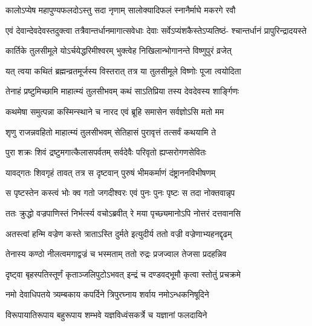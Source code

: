 \twolineshloka
{कालोऽप्येष महापुण्यफलदोऽस्तु सदा नृणाम्}
{सालोक्यादिफलं स्नानैर्माघे मकरगे रवौ} %

\fourlineindentedshloka
{एवं देवान्देवदेवस्तदुक्त्वा}
{तत्रैवान्तर्धानमागात्सवेधाः}
{देवाः सर्वेऽप्यंशकैस्तेऽप्यतिष्ठं-}
{श्चान्तर्धानं प्रापुरिन्द्रादयस्ते} %

\twolineshloka
{कार्तिके तुलसीमूले योऽर्चयेद्धरिमीश्वरम्}
{भुक्त्वेह निखिलान्भोगानन्ते विष्णुपुरं व्रजेत्} %





\twolineshloka
{यत् त्वया कथितं ब्रह्मन्व्रतमूर्जस्य विस्तरात्}
{तत्र या तुलसीमूले विष्णोः पूजा त्वयोदिता} %

\twolineshloka
{तेनाहं प्रष्टुमिच्छामि माहात्म्यं तुलसीभवम्}
{कथं साऽतिप्रिया तस्य देवदेवस्य शार्ङ्गिणः} %

\twolineshloka
{कथमेषा समुत्पन्ना कस्मिन्स्थाने च नारद}
{एवं ब्रूहि समासेन सर्वज्ञोऽसि मतो मम} %


\twolineshloka
{शृणु राजन्नवहितो माहात्म्यं तुलसीभवम्}
{सेतिहासं पुरावृत्तं तत्सर्वं कथयामि ते} %

\twolineshloka
{पुरा शक्रः शिवं द्रष्टुमगात्कैलासपर्वतम्}
{सर्वदेवैः परिवृतो ह्यप्सरोगणसेवितः} %

\twolineshloka
{यावद्गतः शिवगृहं तावत् तत्र स दृष्टवान्}
{पुरुषं भीमकर्माणं दंष्ट्राननविभीषणम्} %

\twolineshloka
{स पृष्टस्तेन कस्त्वं भोः क्व गतो जगदीश्वरः}
{एवं पुनः पुनः पृष्टः स तदा नोक्तवान्नृप} %

\twolineshloka
{ततः क्रुद्धो वज्रपाणिस्तं निर्भर्त्स्य वचोऽब्रवीत्}
{रे मया पृच्छ्यमानोऽपि नोत्तरं दत्तवानसि} %

\twolineshloka
{अतस्त्वां हन्मि वज्रेण कस्ते त्राताऽस्ति दुर्मते}
{इत्युदीर्य ततो वज्री वज्रेणाभ्यहनद्दृढम्} %

\twolineshloka
{तेनास्य कण्ठो नीलत्वमगाद्वज्रं च भस्मताम्}
{ततो रुद्रः प्रजज्वाल तेजसा प्रदहन्निव} %

\twolineshloka
{दृष्ट्वा बृहस्पतिस्तूर्णं कृताञ्जलिपुटोऽभवत्}
{इन्द्रं च दण्डवद्भूमौ कृत्वा स्तोतुं प्रचक्रमे} %


\twolineshloka
{नमो देवाधिपतये त्र्यम्बकाय कपर्दिने}
{त्रिपुरघ्नाय शर्वाय नमोऽन्धकनिषूदिने} %

\twolineshloka
{विरूपायातिरूपाय बहुरूपाय शम्भवे}
{यज्ञविध्वंसकर्त्रे च यज्ञानां फलदायिने} %

